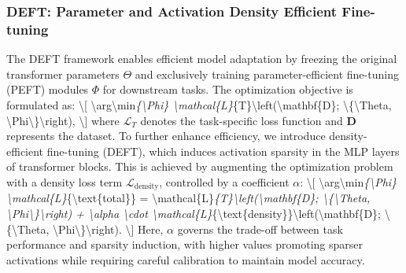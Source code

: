 \documentclass[10pt,twocolumn]{article}
\begin{document}
\subsubsection*{DEFT: Parameter and Activation Density Efficient Fine-tuning}
The DEFT framework enables efficient model adaptation by freezing the original transformer parameters \(\Theta\) and exclusively training parameter-efficient fine-tuning (PEFT) modules \(\Phi\) for downstream tasks. The optimization objective is formulated as: \textbackslash{}[ \textbackslash{}arg\textbackslash{}min\textit{\{\textbackslash{}Phi\} \textbackslash{}mathcal\{L\}}\{T\}\textbackslash{}left(\textbackslash{}mathbf\{D\}; \textbackslash{}\{\textbackslash{}Theta, \textbackslash{}Phi\textbackslash{}\}\textbackslash{}right), \textbackslash{}] where \(\mathcal{L}_{T}\) denotes the task-specific loss function and \(\mathbf{D}\) represents the dataset. To further enhance efficiency, we introduce density-efficient fine-tuning (DEFT), which induces activation sparsity in the MLP layers of transformer blocks. This is achieved by augmenting the optimization problem with a density loss term \(\mathcal{L}_{\text{density}}\), controlled by a coefficient \(\alpha\): \textbackslash{}[ \textbackslash{}arg\textbackslash{}min\textit{\{\textbackslash{}Phi\} \textbackslash{}mathcal\{L\}}\{\textbackslash{}text\{total\}\} = \textbackslash{}mathcal\{L\}\textit{\{T\}\textbackslash{}left(\textbackslash{}mathbf\{D\}; \textbackslash{}\{\textbackslash{}Theta, \textbackslash{}Phi\textbackslash{}\}\textbackslash{}right) + \textbackslash{}alpha \textbackslash{}cdot \textbackslash{}mathcal\{L\}}\{\textbackslash{}text\{density\}\}\textbackslash{}left(\textbackslash{}mathbf\{D\}; \textbackslash{}\{\textbackslash{}Theta, \textbackslash{}Phi\textbackslash{}\}\textbackslash{}right). \textbackslash{}] Here, \(\alpha\) governs the trade-off between task performance and sparsity induction, with higher values promoting sparser activations while requiring careful calibration to maintain model accuracy.
\end{document}
